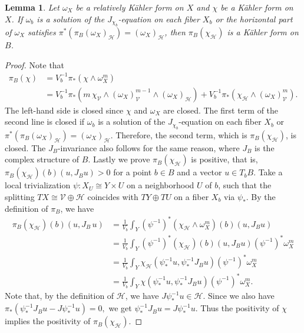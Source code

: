 \documentclass{amsart}
\numberwithin{equation}{section}
\theoremstyle{plain}
\newtheorem{lemma}[equation]{Lemma}
\theoremstyle{definition}
\theoremstyle{remark}
\begin{document}
\begin{lemma}\label{lem:Kahler}
Let $\omega_X$ be a relatively K{\"a}hler form on $X$ and $\chi$ be a K{\"a}hler form on $X$. 
If $\omega_b$ is a solution of the $J_{\chi_b}$-equation on each fiber $X_b$ or the horizontal part of $\omega_X$ satisfies $\pi^*(\pi_B(\omega_X)_\mathcal{H}) = (\omega_X)_\mathcal{H}$, then $\pi_B(\chi_\mathcal{H})$ is a K{\"a}hler form on $B$.
\end{lemma}  
\begin{proof}
Note that
\begin{align*} 
\pi_B(\chi) &= V_b^{-1} \pi_*(\chi \wedge \omega_X^m) \\
&= V_b^{-1} \pi_*\left(m \, \chi_\mathcal{V} \wedge (\omega_X)^{m-1}_\mathcal{V} \wedge (\omega_X)_\mathcal{H} \right) + V_b^{-1}\pi_*(\chi_\mathcal{H} \wedge (\omega_X)^m_\mathcal{V}).
\end{align*}
The left-hand side is closed since $\chi$ and $\omega_X$ are closed. The first term of the second line is closed if $\omega_b$ is a solution of the $J_{\chi_b}$-equation on each fiber $X_b$ or $\pi^*(\pi_B(\omega_X)_\mathcal{H}) = (\omega_X)_\mathcal{H}$. Therefore, the second term, which is $\pi_B(\chi_\mathcal{H})$, is closed.
The $J_B$-invariance also follows for the same reason, where $J_B$ is the complex structure of $B$. 
Lastly we prove $\pi_B(\chi_\mathcal{H})$ is positive, that is, $\pi_B(\chi_\mathcal{H})(b)(u, J_B u) >0$
for a point $b \in B$ and a vector $u \in T_bB$. Take a local trivialization $\psi: X_U \cong Y \times U$ on a neighborhood $U$ of $b$, such that the splitting $TX \cong \mathcal{V} \oplus \mathcal{H}$ coincides with $TY \oplus TU$ on a fiber $X_b$ via $\psi_*$. By the definition of $\pi_B$, we have
\begin{align*}
\pi_B(\chi_\mathcal{H})(b)(u, J_B \, u) &=\frac{1}{V_b} \int_Y (\psi^{-1})^* (\chi_\mathcal{H} \wedge \omega^m_X)(b) (u, J_B u) \\ &= \frac{1}{V_b} \int_Y (\psi^{-1})^* (\chi_\mathcal{H})(b) (u, J_B u) (\psi^{-1})^* \omega^m_X
\\ &= \frac{1}{V_b} \int _Y \chi_\mathcal{H}(\psi^{-1}_*u, \psi^{-1}_* J_B u) (\psi^{-1})^*\omega_X^m
\\ &= \frac{1}{V_b}  \int _Y \chi\left(\psi^{-1}_*u, \psi^{-1}_* J_B u\right) (\psi^{-1})^*\omega_X^m.
\end{align*}
Note that, by the definition of $\mathcal{H}$, we have $J \psi_*^{-1} u \in \mathcal{H}$. Since we also have 
$\pi_*\left(\psi^{-1}_* J_B u-J\psi_*^{-1}u\right)=0,$
we get $\psi^{-1}_* J_B u=J\psi_*^{-1}u$. Thus the positivity of $\chi$ implies the positivity of $\pi_B(\chi_\mathcal{H})$.
\end{proof}
\end{document}

